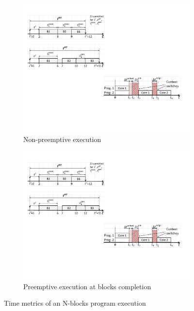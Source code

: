 \begin{figure}
\centering
\begin{subfigure}{.7\columnwidth}
\includegraphics[width=\columnwidth]{figs/nonPreemptiveExecution.pdf}
\caption{Non-preemptive execution}
\label{fig:nonPreemptiveExecution}
\end{subfigure}
\begin{subfigure}{.7\columnwidth}
\includegraphics[width=\columnwidth]{figs/preemptiveExecution.pdf}
\caption{Preemptive execution at blocks completion}
\label{fig:preemptiveExecution}
\end{subfigure}
\caption{Time metrics of an N-blocks program execution}
\label{fig:executionMetrics}
\end{figure}

